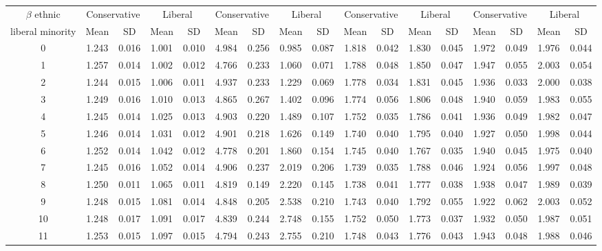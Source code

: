 \documentclass{article}
\begin{document}
\begin{table}[H]
{\begin{tabular}{|c|c|c|c|c|c|c|c|c|c|c|c|c|c|c|c|c|}
 $\beta$ ethnic & \multicolumn{2}{|c|}{Conservative} & \multicolumn{2}{|c|}{Liberal} 
& \multicolumn{2}{|c|}{Conservative} & \multicolumn{2}{|c|}{Liberal} & \multicolumn{2}{|c|}{Conservative} & \multicolumn{2}{|c|}{Liberal} 
& \multicolumn{2}{|c|}{Conservative} & \multicolumn{2}{|c|}{Liberal}\\
 liberal minority & Mean & SD & Mean & SD & Mean & SD & Mean & SD & Mean & SD & Mean & SD & Mean & SD & Mean & SD\\
 \hline
   0 & 1.243 & 0.016 & 1.001 & 0.010 & 4.984 & 0.256 & 0.985 & 0.087 & 1.818 & 0.042 & 1.830 & 0.045 & 1.972 & 0.049 & 1.976 & 0.044 \\ 
     1 & 1.257 & 0.014 & 1.002 & 0.012 & 4.766 & 0.233 & 1.060 & 0.071 & 1.788 & 0.048 & 1.850 & 0.047 & 1.947 & 0.055 & 2.003 & 0.054 \\ 
     2 & 1.244 & 0.015 & 1.006 & 0.011 & 4.937 & 0.233 & 1.229 & 0.069 & 1.778 & 0.034 & 1.831 & 0.045 & 1.936 & 0.033 & 2.000 & 0.038 \\ 
     3 & 1.249 & 0.016 & 1.010 & 0.013 & 4.865 & 0.267 & 1.402 & 0.096 & 1.774 & 0.056 & 1.806 & 0.048 & 1.940 & 0.059 & 1.983 & 0.055 \\ 
     4 & 1.245 & 0.014 & 1.025 & 0.013 & 4.903 & 0.220 & 1.489 & 0.107 & 1.752 & 0.035 & 1.786 & 0.041 & 1.936 & 0.049 & 1.982 & 0.047 \\ 
     5 & 1.246 & 0.014 & 1.031 & 0.012 & 4.901 & 0.218 & 1.626 & 0.149 & 1.740 & 0.040 & 1.795 & 0.040 & 1.927 & 0.050 & 1.998 & 0.044 \\ 
     6 & 1.252 & 0.014 & 1.042 & 0.012 & 4.778 & 0.201 & 1.860 & 0.154 & 1.745 & 0.040 & 1.767 & 0.035 & 1.940 & 0.045 & 1.975 & 0.040 \\ 
     7 & 1.245 & 0.016 & 1.052 & 0.014 & 4.906 & 0.237 & 2.019 & 0.206 & 1.739 & 0.035 & 1.788 & 0.046 & 1.924 & 0.056 & 1.997 & 0.048 \\ 
     8 & 1.250 & 0.011 & 1.065 & 0.011 & 4.819 & 0.149 & 2.220 & 0.145 & 1.738 & 0.041 & 1.777 & 0.038 & 1.938 & 0.047 & 1.989 & 0.039 \\ 
     9 & 1.248 & 0.015 & 1.081 & 0.014 & 4.848 & 0.205 & 2.538 & 0.210 & 1.743 & 0.040 & 1.792 & 0.055 & 1.922 & 0.062 & 2.003 & 0.052 \\ 
    10 & 1.248 & 0.017 & 1.091 & 0.017 & 4.839 & 0.244 & 2.748 & 0.155 & 1.752 & 0.050 & 1.773 & 0.037 & 1.932 & 0.050 & 1.987 & 0.051 \\ 
    11 & 1.253 & 0.015 & 1.097 & 0.015 & 4.794 & 0.243 & 2.755 & 0.210 & 1.748 & 0.043 & 1.776 & 0.043 & 1.943 & 0.048 & 1.988 & 0.046 \\ 

\end{tabular}}
\end{table}
\end{document}

